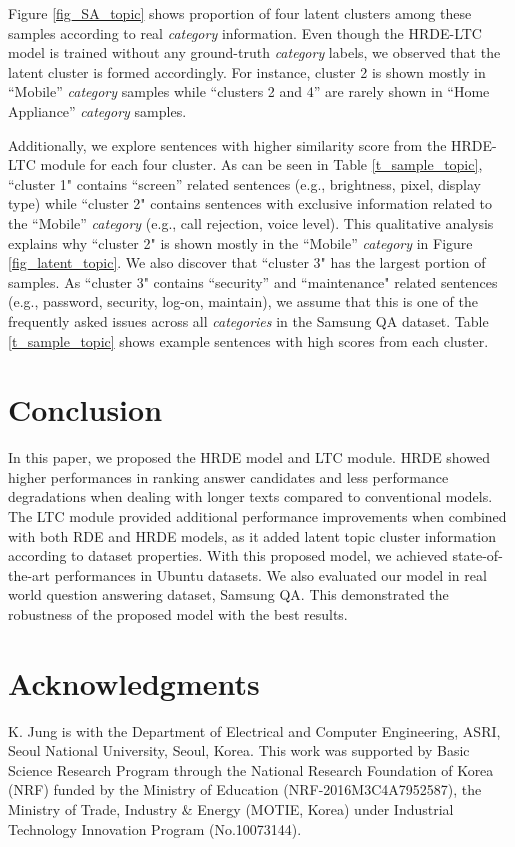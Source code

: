 \documentclass[11pt,a4paper]{article}
\begin{document}
Figure \ref{fig_SA_topic} shows proportion of four latent clusters among these samples according to real \textit{category} information. Even though the HRDE-LTC model is trained without any ground-truth \textit{category} labels, we observed that the latent cluster is formed accordingly. For instance, cluster 2 is shown mostly in ``Mobile'' \textit{category} samples while ``clusters 2 and 4'' are rarely shown in ``Home Appliance'' \textit{category} samples.

Additionally, we explore sentences with higher similarity score from the HRDE-LTC module for each four cluster. 
As can be seen in Table \ref{t_sample_topic}, ``cluster 1" contains ``screen'' related sentences (e.g., brightness, pixel, display type) while ``cluster 2" contains sentences with exclusive information related to the ``Mobile'' \textit{category} (e.g., call rejection, voice level). This qualitative analysis explains why ``cluster 2" is shown mostly in the ``Mobile'' \textit{category} in Figure \ref{fig_latent_topic}. We also discover that ``cluster 3" has the largest portion of samples. 
As ``cluster 3" contains ``security'' and ``maintenance"  related sentences (e.g., password, security, log-on, maintain), we assume that this is one of the frequently asked issues across all \textit{categories} in the Samsung QA dataset.  Table \ref{t_sample_topic} shows example sentences with high scores from each cluster.


\section{Conclusion}
\label{coclusion}
In this paper, we proposed the HRDE model and LTC module. HRDE showed higher performances in ranking answer candidates and less performance degradations when dealing with longer texts compared to conventional models. 
The LTC module provided additional performance improvements when combined with both RDE and HRDE models, as it added latent topic cluster information according to dataset properties.
With this proposed model, we achieved state-of-the-art performances in Ubuntu datasets.
We also evaluated our model in real world question answering dataset, Samsung QA. This demonstrated the robustness of the proposed model with the best results.


\section*{Acknowledgments}
K. Jung is with the Department of Electrical and Computer Engineering, ASRI, Seoul National University, Seoul, Korea. This work was supported by Basic Science Research Program through the National Research Foundation of Korea (NRF) funded by the Ministry of Education (NRF-2016M3C4A7952587), the Ministry of Trade, Industry \& Energy (MOTIE, Korea) under Industrial Technology Innovation Program (No.10073144).
\end{document}
